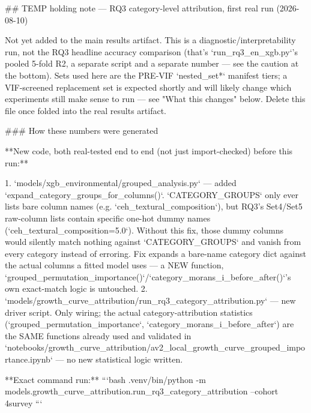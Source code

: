 ## TEMP holding note — RQ3 category-level attribution, first real run (2026-08-10)

Not yet added to the main results artifact. This is a diagnostic/interpretability run, not the
RQ3 headline accuracy comparison (that's `run_rq3_en_xgb.py`'s pooled 5-fold R2, a separate
script and a separate number — see the caution at the bottom). Sets used here are the
PRE-VIF `nested_set*` manifest tiers; a VIF-screened replacement set is expected shortly and will
likely change which experiments still make sense to run — see "What this changes" below. Delete
this file once folded into the real results artifact.

### How these numbers were generated

**New code, both real-tested end to end (not just import-checked) before this run:**

1. `models/xgb_environmental/grouped_analysis.py` — added `expand_category_groups_for_columns()`.
   `CATEGORY_GROUPS` only ever lists bare column names (e.g. `ceh_textural_composition`), but
   RQ3's Set4/Set5 raw-column lists contain specific one-hot dummy names
   (`ceh_textural_composition=5.0`). Without this fix, those dummy columns would silently match
   nothing against `CATEGORY_GROUPS` and vanish from every category instead of erroring. Fix
   expands a bare-name category dict against the actual columns a fitted model uses — a
   NEW function, `grouped_permutation_importance()`/`category_morans_i_before_after()`'s own
   exact-match logic is untouched.
2. `models/growth_curve_attribution/run_rq3_category_attribution.py` — new driver script. Only
   wiring; the actual category-attribution statistics (`grouped_permutation_importance`,
   `category_morans_i_before_after`) are the SAME functions already used and validated in
   `notebooks/growth_curve_attribution/av2_local_growth_curve_grouped_importance.ipynb` — no new
   statistical logic written.

**Exact command run:**
```bash
.venv/bin/python -m models.growth_curve_attribution.run_rq3_category_attribution --cohort 4survey
```

